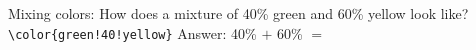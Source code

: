 \documentclass{article}
\begin{document}
\makeatletter
\def\testclr#1#{\@testclr{#1}}
\def\@testclr#1#2{{\fboxsep\z@\fbox{\colorbox#1{#2}{\phantom{XX}}}}}
\makeatother

Mixing colors:
How does a mixture of 40\% green and 60\% yellow look like?
\verb/\color{green!40!yellow}/ 
Answer: 40\%  $+$ 60\%  $=$ 
\end{document}
